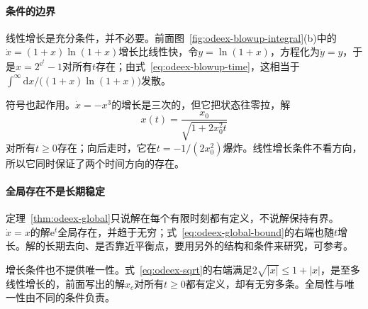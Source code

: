 \paragraph{条件的边界}
线性增长是充分条件，并不必要。前面图~\ref{fig:odeex-blowup-integral}(b)中的$\dot x=(1+x)\ln(1+x)$增长比线性快，令$y=\ln(1+x)$，方程化为$\dot y=y$，于是$x=2^{\mathrm{e}^t}-1$对所有$t$存在；由式~\eqref{eq:odeex-blowup-time}，这相当于$\int^{\infty}\mathrm{d}x/\bigl((1+x)\ln(1+x)\bigr)$发散。

符号也起作用。$\dot x=-x^3$的增长是三次的，但它把状态往零拉，解
\[
 x(t)=\frac{x_0}{\sqrt{1+2x_0^2t}}
\]
对所有$t\geq0$存在；向后走时，它在$t=-1/(2x_0^2)$爆炸。线性增长条件不看方向，所以它同时保证了两个时间方向的存在。

\paragraph{全局存在不是长期稳定}
定理~\ref{thm:odeex-global}只说解在每个有限时刻都有定义，不说解保持有界。$\dot x=x$的解$\mathrm{e}^t$全局存在，并趋于无穷；式~\eqref{eq:odeex-global-bound}的右端也随$t$增长。解的长期去向、是否靠近平衡点，要用另外的结构和条件来研究，可参考。

增长条件也不提供唯一性。式~\eqref{eq:odeex-sqrt}的右端满足$2\sqrt{\lvert x\rvert}\leq1+\lvert x\rvert$，是至多线性增长的，前面写出的解$x_c$对所有$t\geq0$都有定义，却有无穷多条。全局性与唯一性由不同的条件负责。
